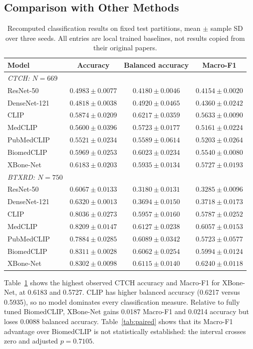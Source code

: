 \documentclass{llncs}
\begin{document}
\subsection{Comparison with Other Methods}
\begin{table}[t]
\caption{Recomputed classification results on fixed test partitions, mean $\pm$ sample SD over three seeds. All entries are local trained baselines, not results copied from their original papers.}
\label{tab:classification}
\centering\small
\begin{tabular}{@{}lccc@{}}
\toprule
Model & Accuracy & Balanced accuracy & Macro-F1 \\
\midrule
\textit{CTCH: $N=669$} & & & \\
ResNet-50 & $0.4983\pm0.0077$ & $0.4180\pm0.0046$ & $0.4154\pm0.0020$\\
DenseNet-121 & $0.4818\pm0.0038$ & $0.4920\pm0.0465$ & $0.4360\pm0.0242$\\
CLIP & $0.5874\pm0.0209$ & $0.6217\pm0.0359$ & $0.5633\pm0.0090$\\
MedCLIP & $0.5600\pm0.0396$ & $0.5723\pm0.0177$ & $0.5161\pm0.0224$\\
PubMedCLIP & $0.5521\pm0.0234$ & $0.5589\pm0.0614$ & $0.5203\pm0.0264$\\
BiomedCLIP & $0.5969\pm0.0253$ & $0.6023\pm0.0234$ & $0.5540\pm0.0080$\\
XBone-Net & $0.6183\pm0.0203$ & $0.5935\pm0.0134$ & $0.5727\pm0.0193$\\
\midrule
\textit{BTXRD: $N=750$} & & & \\
ResNet-50 & $0.6067\pm0.0133$ & $0.3180\pm0.0131$ & $0.3285\pm0.0096$\\
DenseNet-121 & $0.6320\pm0.0013$ & $0.3694\pm0.0150$ & $0.3718\pm0.0173$\\
CLIP & $0.8036\pm0.0273$ & $0.5957\pm0.0160$ & $0.5787\pm0.0252$\\
MedCLIP & $0.8209\pm0.0147$ & $0.6127\pm0.0238$ & $0.6057\pm0.0153$\\
PubMedCLIP & $0.7884\pm0.0285$ & $0.6089\pm0.0342$ & $0.5723\pm0.0577$\\
BiomedCLIP & $0.8311\pm0.0028$ & $0.6062\pm0.0254$ & $0.5994\pm0.0124$\\
XBone-Net & $0.8302\pm0.0098$ & $0.6115\pm0.0140$ & $0.6240\pm0.0118$\\
\bottomrule
\end{tabular}
\end{table}

Table~\ref{tab:classification} shows the highest observed CTCH accuracy and Macro-F1 for XBone-Net, at 0.6183 and 0.5727. CLIP has higher balanced accuracy (0.6217 versus 0.5935), so no model dominates every classification measure. Relative to fully tuned BiomedCLIP, XBone-Net gains 0.0187 Macro-F1 and 0.0214 accuracy but loses 0.0088 balanced accuracy. Table~\ref{tab:paired} shows that its Macro-F1 advantage over BiomedCLIP is not statistically established: the interval crosses zero and adjusted $p=0.7105$.
\end{document}
